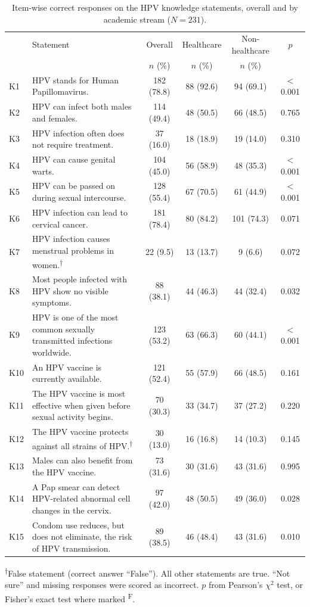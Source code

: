 \begin{table}[htbp]\centering\footnotesize
\caption{Item-wise correct responses on the HPV knowledge statements, overall and by academic stream ($N=231$).}\label{tab:kitems}
\begin{tabularx}{\textwidth}{@{}l >{\raggedright\arraybackslash}X c c c c@{}}\toprule
 & Statement & Overall & Healthcare & Non-healthcare & $p$ \\
 &  & $n$ (\%) & $n$ (\%) & $n$ (\%) &  \\\midrule
K1 & HPV stands for Human Papillomavirus. & 182 (78.8) & 88 (92.6) & 94 (69.1) & $<$0.001 \\
K2 & HPV can infect both males and females. & 114 (49.4) & 48 (50.5) & 66 (48.5) & 0.765 \\
K3 & HPV infection often does not require treatment. & 37 (16.0) & 18 (18.9) & 19 (14.0) & 0.310 \\
K4 & HPV can cause genital warts. & 104 (45.0) & 56 (58.9) & 48 (35.3) & $<$0.001 \\
K5 & HPV can be passed on during sexual intercourse. & 128 (55.4) & 67 (70.5) & 61 (44.9) & $<$0.001 \\
K6 & HPV infection can lead to cervical cancer. & 181 (78.4) & 80 (84.2) & 101 (74.3) & 0.071 \\
K7 & HPV infection causes menstrual problems in women.\textsuperscript{$\dagger$} & 22 (9.5) & 13 (13.7) & 9 (6.6) & 0.072 \\
K8 & Most people infected with HPV show no visible symptoms. & 88 (38.1) & 44 (46.3) & 44 (32.4) & 0.032 \\
K9 & HPV is one of the most common sexually transmitted infections worldwide. & 123 (53.2) & 63 (66.3) & 60 (44.1) & $<$0.001 \\
K10 & An HPV vaccine is currently available. & 121 (52.4) & 55 (57.9) & 66 (48.5) & 0.161 \\
K11 & The HPV vaccine is most effective when given before sexual activity begins. & 70 (30.3) & 33 (34.7) & 37 (27.2) & 0.220 \\
K12 & The HPV vaccine protects against all strains of HPV.\textsuperscript{$\dagger$} & 30 (13.0) & 16 (16.8) & 14 (10.3) & 0.145 \\
K13 & Males can also benefit from the HPV vaccine. & 73 (31.6) & 30 (31.6) & 43 (31.6) & 0.995 \\
K14 & A Pap smear can detect HPV-related abnormal cell changes in the cervix. & 97 (42.0) & 48 (50.5) & 49 (36.0) & 0.028 \\
K15 & Condom use reduces, but does not eliminate, the risk of HPV transmission. & 89 (38.5) & 46 (48.4) & 43 (31.6) & 0.010 \\
\bottomrule\end{tabularx}

\vspace{2pt}\raggedright\scriptsize \textsuperscript{$\dagger$}False statement (correct answer ``False''). All other statements are true. ``Not sure'' and missing responses were scored as incorrect. $p$ from Pearson's $\chi^2$ test, or Fisher's exact test where marked \textsuperscript{F}.
\end{table}
